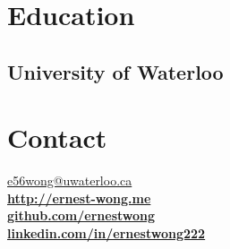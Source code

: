 \documentclass[]{deedy-resume}
\begin{document}
\begin{minipage}[t]{0.33\textwidth}

\section{Education}

\subsection{University of Waterloo}

\sectionsep


\section{Contact}
\href{mailto:e56wong@uwaterloo.ca}{e56wong@uwaterloo.ca}\\
\href{http://ernest-wong.me}{\bf http://ernest-wong.me} \\
\href{https://github.com/ernestwong}{\bf github.com/ernestwong} \\
\href{https://www.linkedin.com/in/ernestwong222}{\bf linkedin.com/in/ernestwong222} \\
\sectionsep





%
%

\end{minipage}
\end{document}
